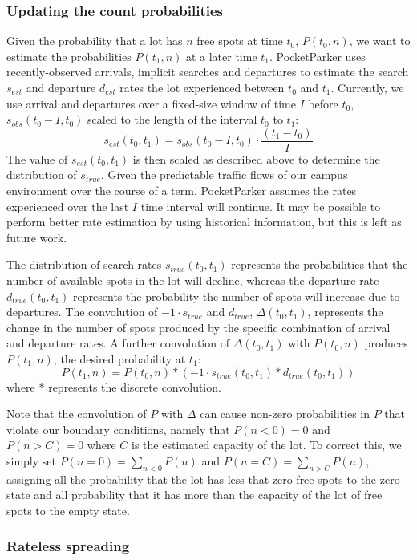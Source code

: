 \subsubsection{Updating the count probabilities}

Given the probability that a lot has $n$ free spots at time $t_0$, $P(t_0,
n)$, we want to estimate the probabilities $P(t_1, n)$ at a later time $t_1$.
PocketParker uses recently-observed arrivals, implicit searches and
departures to estimate the search $s_{est}$ and departure $d_{est}$ rates the
lot experienced between $t_0$ and $t_1$. Currently, we use arrival and
departures over a fixed-size window of time $I$ before $t_0$, $s_{obs}(t_0 -
I, t_0)$ scaled to the length of the interval $t_0$ to $t_1$:
%
\[s_{est}(t_0, t_1) = s_{obs}(t_0 - I, t_0) \cdot \frac{(t_1 - t_0)}{I} \]
%
The value of $s_{est}(t_0, t_1)$ is then scaled as described above to
determine the distribution of $s_{true}$.  Given the predictable traffic flows
of our campus environment over the course of a term, PocketParker assumes the
rates experienced over the last $I$ time interval will continue. It may be
possible to perform better rate estimation by using historical information,
but this is left as future work.

The distribution of search rates $s_{true}(t_0, t_1)$ represents the
probabilities that the number of available spots in the lot will decline,
whereas the departure rate $d_{true}(t_0, t_1)$ represents the probability
the number of spots will increase due to departures. The convolution of $-1
\cdot s_{true}$ and $d_{true}$, $\Delta(t_0, t_1)$, represents the change in
the number of spots produced by the specific combination of arrival and
departure rates. A further convolution of $\Delta(t_0, t_1)$ with $P(t_0,
n)$ produces $P(t_1, n)$, the desired probability at $t_1$:
%
\[ P(t_1, n) = P(t_0, n) * (-1 \cdot s_{true}(t_0, t_1) * d_{true}(t_0,
t_1)) \]
%
where $*$ represents the discrete convolution.

Note that the convolution of $P$ with $\Delta$ can cause non-zero
probabilities in $P$ that violate our boundary conditions, namely that
$P(n < 0) = 0$ and $P(n > C) = 0$ where $C$ is the estimated capacity of
the lot. To correct this, we simply set $P(n = 0) = \sum_{n < 0} P(n)$
and $P(n = C) = \sum_{n > C} P(n)$, assigning all the probability that
the lot has less that zero free spots to the zero state and all probability
that it has more than the capacity of the lot of free spots to the empty
state.

\subsubsection{Rateless spreading}


